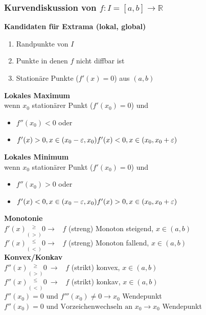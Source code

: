 \documentclass[6pt,a4paper]{scrartcl}
\begin{document}
\begin{multicols*}{4}
\subsubsection{Kurvendiskussion von $f: I = [a, b] \rightarrow \mathbb{R}$}
\textbf{Kandidaten für Extrama (lokal, global)}
\begin{enumerate}\itemsep0pt
\item Randpunkte von $I$
\item Punkte in denen $f$ nicht diffbar ist
\item Stationäre Punkte ($f'(x)=0$) aus $(a,b)$
\end{enumerate}
\textbf{Lokales Maximum} \\
wenn $x_0$ stationärer Punkt ($f'(x_0) = 0$) und
\begin{itemize}\itemsep0pt
\item
$f''(x_0)<0$ oder
\item
$f'(x) > 0, x \in (x_0-\varepsilon, x_0) \\
 f'(x) < 0, x \in (x_0, x_0+\varepsilon)$
\end{itemize}
\textbf{Lokales Minimum} \\
wenn $x_0$ stationärer Punkt ($f'(x_0) = 0$) und
\begin{itemize}\itemsep0pt
\item
$f''(x_0)>0$ oder
\item
$f'(x) < 0, x \in (x_0-\varepsilon, x_0) \\
 f'(x) > 0, x \in (x_0, x_0+\varepsilon)$
\end{itemize}
\textbf{Monotonie} \\
$f'(x) \underset{(>)}{^{\ge}} 0 \rightarrow$ \ $f$ (streng) Monoton steigend, $x\in(a,b)$\\
$f'(x) \underset{(<)}{^{\le}} 0 \rightarrow$ \ $f$ (streng) Monoton fallend, $x\in(a,b)$\\
\textbf{Konvex/Konkav} \\
$f''(x) \underset{(>)}{^{\ge}} 0 \ \rightarrow$ \ $f$ (strikt) konvex, $x\in(a,b)$\\
$f''(x) \underset{(<)}{^{\le}} 0 \ \rightarrow$ \ $f$ (strikt) konkav, $x\in(a,b)$\\
$f''(x_0)=0 \text{ und } f'''(x_0) \ne 0 \rightarrow x_0$ Wendepunkt \\
$f''(x_0)=0 \text{ und Vorzeichenwechseln an } x_0 \rightarrow x_0$ Wendepunkt \\

\end{multicols*}
\end{document}
